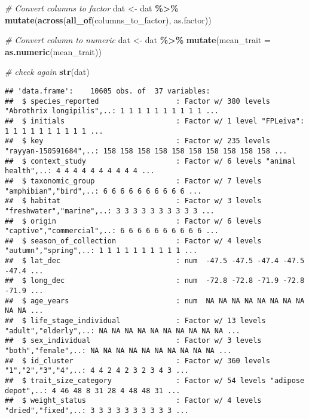 \documentclass[
]{article}
\newenvironment{Shaded}{\begin{snugshade}}{\end{snugshade}}
\newcommand{\AttributeTok}[1]{\textcolor[rgb]{0.13,0.29,0.53}{#1}}
\newcommand{\CommentTok}[1]{\textcolor[rgb]{0.56,0.35,0.01}{\textit{#1}}}
\newcommand{\FunctionTok}[1]{\textcolor[rgb]{0.13,0.29,0.53}{\textbf{#1}}}
\newcommand{\NormalTok}[1]{#1}
\newcommand{\OtherTok}[1]{\textcolor[rgb]{0.56,0.35,0.01}{#1}}
\newcommand{\SpecialCharTok}[1]{\textcolor[rgb]{0.81,0.36,0.00}{\textbf{#1}}}
\begin{document}
\begin{Shaded}
\begin{Highlighting}[]
\CommentTok{\# Convert columns to factor}
\NormalTok{dat }\OtherTok{\textless{}{-}}\NormalTok{ dat }\SpecialCharTok{\%\textgreater{}\%}
  \FunctionTok{mutate}\NormalTok{(}\FunctionTok{across}\NormalTok{(}\FunctionTok{all\_of}\NormalTok{(columns\_to\_factor), as.factor))}

\CommentTok{\# Convert column to numeric}
\NormalTok{dat }\OtherTok{\textless{}{-}}\NormalTok{ dat }\SpecialCharTok{\%\textgreater{}\%}
  \FunctionTok{mutate}\NormalTok{(}\AttributeTok{mean\_trait =} \FunctionTok{as.numeric}\NormalTok{(mean\_trait))}

\CommentTok{\# check again}
\FunctionTok{str}\NormalTok{(dat)}
\end{Highlighting}
\end{Shaded}

\begin{verbatim}
## 'data.frame':    10605 obs. of  37 variables:
##  $ species_reported                  : Factor w/ 380 levels "Abrothrix longipilis",..: 1 1 1 1 1 1 1 1 1 1 ...
##  $ initials                          : Factor w/ 1 level "FPLeiva": 1 1 1 1 1 1 1 1 1 1 ...
##  $ key                               : Factor w/ 235 levels "rayyan-150591684",..: 158 158 158 158 158 158 158 158 158 158 ...
##  $ context_study                     : Factor w/ 6 levels "animal health",..: 4 4 4 4 4 4 4 4 4 4 ...
##  $ taxonomic_group                   : Factor w/ 7 levels "amphibian","bird",..: 6 6 6 6 6 6 6 6 6 6 ...
##  $ habitat                           : Factor w/ 3 levels "freshwater","marine",..: 3 3 3 3 3 3 3 3 3 3 ...
##  $ origin                            : Factor w/ 6 levels "captive","commercial",..: 6 6 6 6 6 6 6 6 6 6 ...
##  $ season_of_collection              : Factor w/ 4 levels "autumn","spring",..: 1 1 1 1 1 1 1 1 1 1 ...
##  $ lat_dec                           : num  -47.5 -47.5 -47.4 -47.5 -47.4 ...
##  $ long_dec                          : num  -72.8 -72.8 -71.9 -72.8 -71.9 ...
##  $ age_years                         : num  NA NA NA NA NA NA NA NA NA NA ...
##  $ life_stage_individual             : Factor w/ 13 levels "adult","elderly",..: NA NA NA NA NA NA NA NA NA NA ...
##  $ sex_individual                    : Factor w/ 3 levels "both","female",..: NA NA NA NA NA NA NA NA NA NA ...
##  $ id_cluster                        : Factor w/ 360 levels "1","2","3","4",..: 4 4 2 4 2 3 2 3 4 3 ...
##  $ trait_size_category               : Factor w/ 54 levels "adipose depot",..: 4 46 48 8 31 28 4 48 48 31 ...
##  $ weight_status                     : Factor w/ 4 levels "dried","fixed",..: 3 3 3 3 3 3 3 3 3 3 ...

\end{verbatim}
\end{document}
